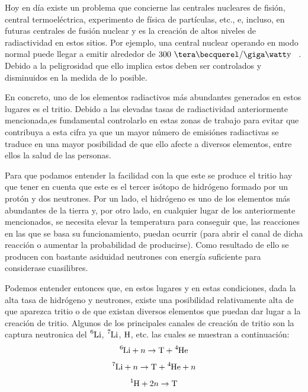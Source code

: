 Hoy en día existe un problema que concierne  las  centrales nucleares de fisión, central termoeléctrica,  experimento de física de partículas, etc., e, incluso, en futuras centrales de fusión nuclear y es la creación de altos niveles de radiactividad en estos sitios. Por ejemplo, una central nuclear operando en modo normal puede llegar a emitir alrededor de $300\ \tera\becquerel/\giga\watt\mathrm{y}$ ~\cite{300TBq}.  Debido a la peligrosidad que ello implica estos deben ser controlados y disminuidos en la medida de lo posible.

En concreto, uno de los elementos radiactivos más abundantes generados en estos lugares es el tritio. Debido a las elevadas tasas de radiactividad anteriormente mencionada,es fundamental controlarlo en estas zonas de trabajo para evitar que contribuya a esta cifra ya que un mayor número de emisiónes radiactivas se traduce en una mayor posibilidad de que ello afecte a diversos elementos, entre ellos la salud de las personas.

Para que podamos entender la facilidad con la que este se produce el tritio hay que tener en cuenta que este es el tercer isótopo de hidrógeno formado por un protón y dos neutrones. Por un lado, el hidrógeno es uno de los elementos más abundantes de la tierra y, por otro lado, en cualquier lugar de los anteriormente mencionados, se necesita elevar la temperatura para conseguir que, las reacciones en las que se basa su funcionamiento, puedan ocurrir (para abrir el canal de dicha reacción o aumentar la probabilidad de producirse). Como resultado de ello se producen con bastante asiduidad neutrones con energía suficiente para considerase cuasilibres. 

Podemos entender entonces que, en estos lugares y en estas condiciones, dada la alta tasa de hidrógeno y neutrones, existe una posibilidad relativamente alta de que aparezca tritio o de que existan diversos elementos que puedan dar lugar a la creación de tritio. Algunos de los principales canales de creación de tritio son la captura neutronica del $\ce{^6Li}$, $\ce{^7Li}$, $\ce{H}$, etc. las cuales se muestran a continuación:
\begin{equation}
\ce{^{6}Li} + n \rightarrow \ce{T} + \ce{^{4}He}
\label{capneuLi6}
\end{equation}
\begin{equation}
\ce{^{7}Li} + n \rightarrow  \ce{T} + \ce{^{4}He} + n
\label{capneuLi7}
\end{equation}
\begin{equation}
\ce{^{1}H} + 2n \rightarrow  \ce{T}  
\label{capneuH}
\end{equation}

